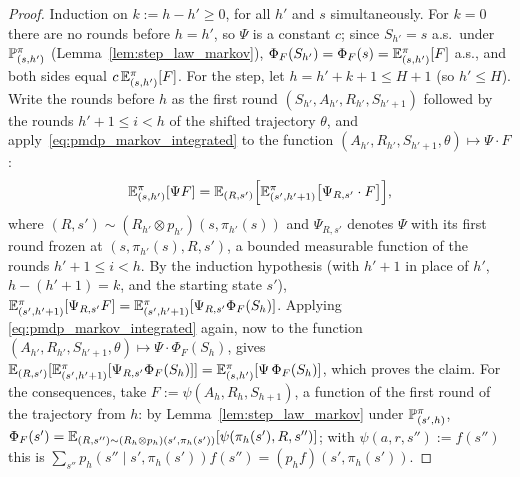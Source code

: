 \begin{proof}
\leanok
Induction on $k := h - h' \ge 0$, for all $h'$ and $s$ simultaneously. For $k = 0$ there are
no rounds before $h = h'$, so $\Psi$ is a constant $c$; since $S_{h'} = s$ a.s.\ under
$\mathbb{P}^\pi_{(s,h')}$ (Lemma~\ref{lem:step_law_markov}), $\Phi_F(S_{h'}) = \Phi_F(s) =
\mathbb{E}^\pi_{(s,h')}[F]$ a.s., and both sides equal $c\,\mathbb{E}^\pi_{(s,h')}[F]$. For the step, let
$h = h' + k + 1 \le H + 1$ (so $h' \le H$). Write the rounds before $h$ as the first round
$(S_{h'}, A_{h'}, R_{h'}, S_{h'+1})$ followed by the rounds $h' + 1 \le i < h$ of the shifted
trajectory $\theta$, and apply~\eqref{eq:pmdp_markov_integrated} to the function
$(A_{h'}, R_{h'}, S_{h'+1}, \theta) \mapsto \Psi\cdot F$:
\[
  \mathbb{E}^\pi_{(s,h')}[\Psi F]
  = \mathbb{E}_{(R,s')}\Big[\mathbb{E}^\pi_{(s',h'+1)}\big[\Psi_{R,s'}\cdot F\big]\Big],
\]
where $(R, s') \sim (R_{h'} \otimes p_{h'})(s, \pi_{h'}(s))$ and $\Psi_{R,s'}$ denotes $\Psi$
with its first round frozen at $(s, \pi_{h'}(s), R, s')$, a bounded measurable function of the
rounds $h' + 1 \le i < h$. By the induction hypothesis (with $h' + 1$ in place of $h'$,
$h - (h' + 1) = k$, and the starting state $s'$),
$\mathbb{E}^\pi_{(s',h'+1)}[\Psi_{R,s'} F] = \mathbb{E}^\pi_{(s',h'+1)}[\Psi_{R,s'}\Phi_F(S_h)]$. Applying
\eqref{eq:pmdp_markov_integrated} again, now to the function
$(A_{h'}, R_{h'}, S_{h'+1}, \theta) \mapsto \Psi\cdot\Phi_F(S_h)$, gives
$\mathbb{E}_{(R,s')}[\mathbb{E}^\pi_{(s',h'+1)}[\Psi_{R,s'}\Phi_F(S_h)]] = \mathbb{E}^\pi_{(s,h')}[\Psi\,\Phi_F(S_h)]$,
which proves the claim. For the consequences, take $F := \psi(A_h, R_h, S_{h+1})$, a function
of the first round of the trajectory from $h$: by Lemma~\ref{lem:step_law_markov} under
$\mathbb{P}^\pi_{(s',h)}$, $\Phi_F(s') = \mathbb{E}_{(R,s'') \sim (R_h\otimes p_h)(s', \pi_h(s'))}[\psi(\pi_h(s'), R, s'')]$;
with $\psi(a, r, s'') := f(s'')$ this is $\sum_{s''} p_h(s'' \mid s', \pi_h(s')) f(s'') = (p_h f)(s', \pi_h(s'))$.
\end{proof}

